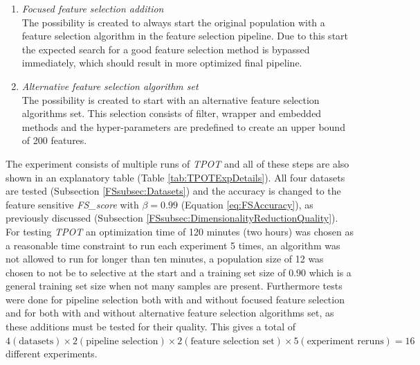\documentclass[10pt,a4paper]{report}
\begin{document}
	\begin{enumerate}
		\item \textit{Focused feature selection addition} \\
		The possibility is created to always start the original population with a feature selection algorithm in the feature selection pipeline. Due to this start the expected search for a good feature selection method is bypassed immediately, which should result in more optimized final pipeline.
		\item \textit{Alternative feature selection algorithm set} \\
		The possibility is created to start with an alternative feature selection algorithms set. This selection consists of filter, wrapper and embedded methods and the hyper-parameters are predefined to create an upper bound of 200 features.
	\end{enumerate}
	
	The experiment consists of multiple runs of \textit{TPOT} and all of these steps are also shown in an explanatory table (Table \ref{tab:TPOTExpDetails}). All four datasets are tested (Subsection \ref{FSsubsec:Datasets}) and the accuracy is changed to the feature sensitive \textit{FS\_score} with $\beta = 0.99$ (Equation \ref{eq:FSAccuracy}), as previously discussed (Subsection \ref{FSsubsec:DimensionalityReductionQuality}). For testing \textit{TPOT} an optimization time of 120 minutes (two hours) was chosen as a reasonable time constraint to run each experiment 5 times, an algorithm was not allowed to run for longer than ten minutes, a population size of 12 was chosen to not be to selective at the start and a training set size of $0.90$ which is a general training set size when not many samples are present. Furthermore tests were done for pipeline selection both with and without focused feature selection  and for both with and without alternative feature selection algorithms set, as these additions must be tested for their quality. This gives a total of $4 (\text{datasets}) \times 2 (\text{pipeline selection}) \times 2 (\text{feature selection set}) \times 5 (\text{experiment reruns}) = 16$ different experiments.
	
\end{document}
